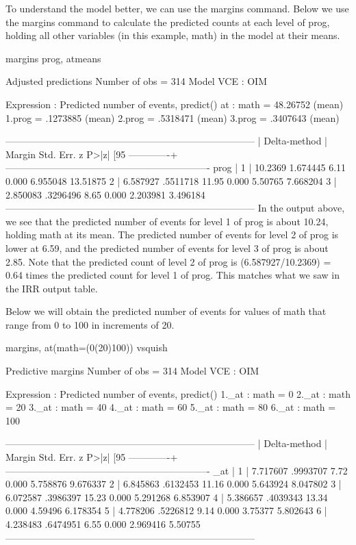 To understand the model better, we can use the margins command. Below we use the margins command to calculate the predicted counts at each level of prog, holding all other variables (in this example, math) in the model at their means.

margins prog, atmeans

Adjusted predictions                              Number of obs   =        314
Model VCE    : OIM

Expression   : Predicted number of events, predict()
at           : math            =    48.26752 (mean)
1.prog          =    .1273885 (mean)
2.prog          =    .5318471 (mean)
3.prog          =    .3407643 (mean)

------------------------------------------------------------------------------
|            Delta-method
|     Margin   Std. Err.      z    P>|z|     [95%
-------------+----------------------------------------------------------------
prog |
1  |    10.2369   1.674445     6.11   0.000     6.955048    13.51875
2  |   6.587927   .5511718    11.95   0.000      5.50765    7.668204
3  |   2.850083   .3296496     8.65   0.000     2.203981    3.496184
------------------------------------------------------------------------------
In the output above, we see that the predicted number of events for level 1 of prog is about 10.24, holding math at its mean.  The predicted number of events for level 2 of prog is lower at 6.59, and the predicted number of events for level 3 of prog is about 2.85. Note that the predicted count of level 2 of prog is (6.587927/10.2369) = 0.64 times the predicted count for level 1 of prog. This matches what we saw in the IRR output table.

Below we will obtain the predicted number of events for values of math that range from 0 to 100 in increments of 20.

margins, at(math=(0(20)100)) vsquish

Predictive margins                                Number of obs   =        314
Model VCE    : OIM

Expression   : Predicted number of events, predict()
1._at        : math            =           0
2._at        : math            =          20
3._at        : math            =          40
4._at        : math            =          60
5._at        : math            =          80
6._at        : math            =         100

------------------------------------------------------------------------------
|            Delta-method
|     Margin   Std. Err.      z    P>|z|     [95%
-------------+----------------------------------------------------------------
_at |
1  |   7.717607   .9993707     7.72   0.000     5.758876    9.676337
2  |   6.845863   .6132453    11.16   0.000     5.643924    8.047802
3  |   6.072587   .3986397    15.23   0.000     5.291268    6.853907
4  |   5.386657   .4039343    13.34   0.000      4.59496    6.178354
5  |   4.778206   .5226812     9.14   0.000      3.75377    5.802643
6  |   4.238483   .6474951     6.55   0.000     2.969416     5.50755
------------------------------------------------------------------------------

